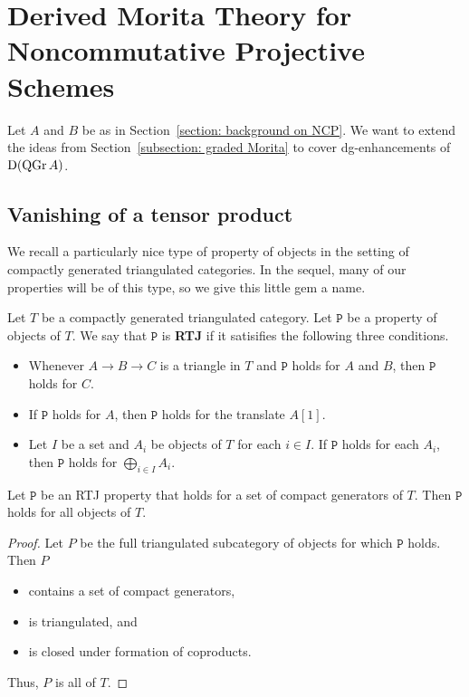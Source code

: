 \documentclass[dissertation.tex]{subfiles}
\begin{document}
\section{Derived Morita Theory for Noncommutative Projective Schemes} \label{section: morita for NCP}

Let \(A\) and \(B\) be as in Section~\ref{section: background on NCP}. We want to extend the ideas from Section~\ref{subsection: graded Morita} to cover dg-enhancements of \(\mathrm{D}(\operatorname{QGr}A)\). 

\subsection{Vanishing of a tensor product} \label{subsection: vanishing of tensor}

We recall a particularly nice type of property of objects in the setting of compactly generated triangulated categories.
In the sequel, many of our properties will be of this type, so we give this little gem a name.

\begin{definition} \label{definition: run the jewels}
  Let \(T\) be a compactly generated triangulated category.
  Let \(\mathtt{P}\) be a property of objects of \(T\). 
  We say that \(\mathtt{P}\) is \textbf{RTJ} if it satisifies the following three conditions.
  \begin{itemize}
  \item Whenever \(A \to B \to C\) is a triangle in \(T\) and \(\mathtt{P}\) holds for \(A\) and \(B\), then \(\mathtt{P}\) holds for \(C\). 
  \item If \(\mathtt{P}\) holds for \(A\), then \(\mathtt{P}\) holds for the translate \(A[1]\).
  \item Let \(I\) be a set and \(A_i\) be objects of \(T\) for each \(i \in I\). If \(\mathtt{P}\) holds for each \(A_i\), then \(\mathtt{P}\) holds for \(\bigoplus_{i \in I} A_i\). 
  \end{itemize}
\end{definition}

\begin{proposition} \label{proposition: RTJ properties}
  Let \(\mathtt{P}\) be an RTJ property that holds for a set of compact generators of \(T\). Then \(\mathtt{P}\) holds for all objects of \(T\).
\end{proposition}

\begin{proof}
  Let \(P\) be the full triangulated subcategory of objects for which \(\mathtt{P}\) holds. Then \(P\)
  \begin{itemize}
  \item contains a set of compact generators,
  \item is triangulated, and
  \item is closed under formation of coproducts. 
  \end{itemize}
  Thus, \(P\) is all of \(T\). 
\end{proof}
\end{document}
